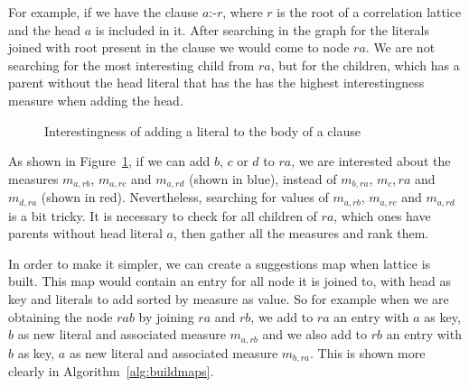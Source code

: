 For example, if we have the clause $a$:-$r$, where $r$ is the root of a correlation lattice and the head $a$ is included
in it. After searching in the graph for the literals joined with root present in the clause we would come to node
$ra$. We are not searching for the most interesting child from $ra$, but for the children, which has a parent without
the head literal that has the has the highest interestingness measure when adding the head.

\begin{figure}[!h]
  \caption{Interestingness of adding a literal to the body of a clause}
  \centering
  \label{fig:latticeSuggestion}
\end{figure}

As shown in Figure~\ref{fig:latticeSuggestion}, if we can add $b$, $c$ or $d$ to $ra$, we are interested about the
measures $m_{a,rb}$, $m_{a,rc}$ and $m_{a,rd}$ (shown in blue), instead of $m_{b,ra}$, $m_c,ra$ and $m_{d,ra}$ (shown in
red). Nevertheless, searching for values of $m_{a,rb}$, $m_{a,rc}$ and $m_{a,rd}$ is a bit tricky. It is necessary to
check for all children of $ra$, which ones have parents without head literal $a$, then gather all the measures and rank
them.

In order to make it simpler, we can create a suggestions map when lattice is built. This map would contain an entry for
all node it is joined to, with head as key and literals to add sorted by measure as value. So for example when we are
obtaining the node $rab$ by joining $ra$ and $rb$, we add to $ra$ an entry with $a$ as key, $b$ as new literal and
associated measure $m_{a,rb}$ and we also add to $rb$ an entry with $b$ as key, $a$ as new literal and associated
measure $m_{b,ra}$. This is shown more clearly in Algorithm~\ref{alg:buildmaps}.

